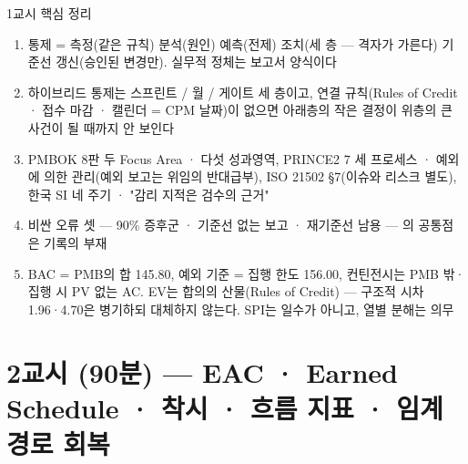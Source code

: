 \begin{frame}{1교시 핵심 정리}
\begin{enumerate}
\item 통제 = 측정(같은 규칙) \ra{} 분석(원인) \ra{} 예측(전제) \ra{} 조치(세 층 — 격자가 가른다) \ra{} 기준선 갱신(승인된 변경만). 실무적 정체는 보고서 양식이다
\item 하이브리드 통제는 스프린트 / 월 / 게이트 세 층이고, 연결 규칙(Rules of Credit · 접수 마감 · 캘린더 = CPM 날짜)이 없으면 아래층의 작은 결정이 위층의 큰 사건이 될 때까지 안 보인다
\item PMBOK 8판 두 Focus Area · 다섯 성과영역, PRINCE2 7 세 프로세스 · 예외에 의한 관리(예외 보고는 위임의 반대급부), ISO 21502 §7(이슈와 리스크 별도), 한국 SI 네 주기 · "감리 지적은 검수의 근거"
\item 비싼 오류 셋 — 90\% 증후군 · 기준선 없는 보고 · 재기준선 남용 — 의 공통점은 기록의 부재
\item BAC = PMB의 합 145.80, 예외 기준 = 집행 한도 156.00, 컨틴전시는 PMB 밖·집행 시 PV 없는 AC. EV는 합의의 산물(Rules of Credit) — 구조적 시차 1.96·4.70은 병기하되 대체하지 않는다. SPI는 일수가 아니고, 열별 분해는 의무
\end{enumerate}
\end{frame}

\section{2교시 (90분) — EAC · Earned Schedule · 착시 · 흐름 지표 · 임계경로 회복}

